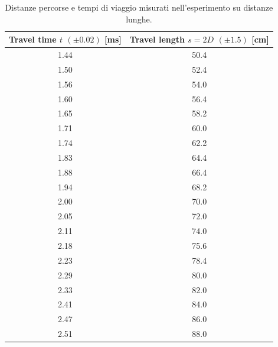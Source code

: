 \documentclass[10pt, a4paper, italian]{article}
\begin{document}
\begin{table}[htbp]
\centering
	\begin{tabular}{cc}
	\toprule
	Travel time $t$ $(\pm 0.02)$ [ms] & Travel length $s = 2D$ $(\pm 1.5)$ [cm] \\
	\midrule
	\midrule
	1.44                              & 50.4                                  \\
	1.50                              & 52.4                                  \\
	1.56                              & 54.0                                  \\
	1.60                              & 56.4                                  \\
	1.65                              & 58.2                                  \\
	1.71                              & 60.0                                  \\
	1.74                              & 62.2                                  \\
	1.83                              & 64.4                                  \\
	1.88                              & 66.4                                  \\
	1.94                              & 68.2                                  \\
	2.00                              & 70.0                                  \\
	2.05                              & 72.0                                  \\
	2.11                              & 74.0                                  \\
	2.18                              & 75.6                                  \\
	2.23                              & 78.4                                  \\
	2.29                              & 80.0                                  \\
	2.33                              & 82.0                                  \\
	2.41                              & 84.0                                  \\
	2.47                              & 86.0                                  \\
	2.51                              & 88.0                                  \\
	\bottomrule
	\end{tabular}
	\caption{Distanze percorse e tempi di viaggio misurati nell'esperimento su
	distanze lunghe.}
\end{table}
\end{document}
